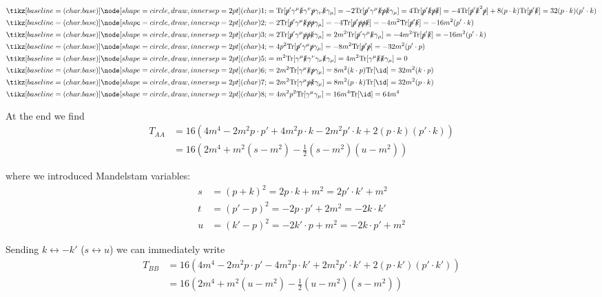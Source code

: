\documentclass[TheoreticalPhy_ModB.tex]{subfiles}
\begin{document}
\begin{align*}
\circled 1&=\Tr[\slashed p'\gamma^\mu\slashed k\gamma^\nu\slashed p\gamma_\nu\slashed k\gamma_\mu]
=-2\Tr[\slashed p'\gamma^\mu\slashed k\slashed p\slashed k\gamma_\mu]
=4\Tr[\slashed p'\slashed k\slashed p\slashed k]
=-4\Tr[\slashed p'\slashed k^2\slashed p]+8(p\cdot k)\Tr[\slashed p'\slashed k]
=32(p\cdot k)(p'\cdot k)\\
\circled 2&=2\Tr[\slashed p'\gamma^\mu\slashed k\slashed p\slashed p\gamma_\mu]
=-4\Tr[\slashed p'\slashed p\slashed p\slashed k]
=-4m^2\Tr[\slashed p'\slashed k]
=-16m^2(p'\cdot k)\\
\circled 3&=2\Tr[\slashed p'\gamma^\mu \slashed p\slashed p\slashed k\gamma_\mu]
=2m^2\Tr[\slashed p'\gamma^\mu \slashed k\gamma_\mu]
=-4m^2\Tr[\slashed p'\slashed k]
=-16m^2(p'\cdot k)\\
\circled 4&=4p^2\Tr[\slashed p'\gamma^\mu \slashed p\gamma_\mu]
=-8m^2\Tr[\slashed p'\slashed p]=-32m^2(p'\cdot p)\\
\circled 5&=m^2\Tr[\gamma^\mu\slashed k\gamma^\nu\gamma_\nu\slashed k\gamma_\mu]
=4m^2\Tr[\gamma^\mu\slashed k\slashed k\gamma_\mu]
=0\\
\circled 6&=2m^2\Tr[\gamma^\mu\slashed k\slashed p\gamma_\mu]
=8m^2(k\cdot p)\Tr[ \id]=32m^2(k\cdot p)\\
\circled 7&=2m^2\Tr[\gamma^\mu \slashed p\slashed k\gamma_\mu]
=8m^2(p\cdot k)\Tr[\id]=32m^2(p\cdot k)\\
\circled 8&=4m^2p^2\Tr[\gamma^\mu \gamma_\mu ]
=16m^4\Tr[\id]=64m^4\\
\end{align*}

At the end we find
\begin{align*}
T_{AA}&=16\left(4m^4-2m^2p\cdot p'+4m^2p\cdot k-2m^2p'\cdot k+2(p\cdot k)(p'\cdot k)\right)\\
&=16\left(2m^4+m^2(s-m^2)-\frac12(s-m^2)(u-m^2)\right)
\end{align*}

where we introduced Mandelstam variables:
\begin{align*}
s&=(p+k)^2=2p\cdot k+m^2=2p'\cdot k'+m^2\\
t&=(p'-p)^2=-2p\cdot p'+2m^2=-2k\cdot k'\\
u&=(k'-p)^2=-2k'\cdot p+m^2=-2k\cdot p'+m^2
\end{align*}

Sending $k\leftrightarrow-k'$ ($s\leftrightarrow u$) we can immediately write
\begin{align*}
T_{BB}&=16\left(4m^4-2m^2p\cdot p'-4m^2p\cdot k'+2m^2p'\cdot k'+2(p\cdot k')(p'\cdot k')\right)\\
&=16\left(2m^4+m^2(u-m^2)-\frac12(u-m^2)(s-m^2)\right)
\end{align*}
\end{document}
